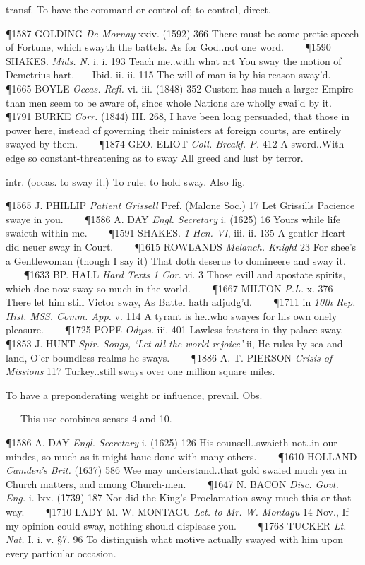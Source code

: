 \begin{description}[wide, labelwidth=!, labelindent=0pt]
\begin{myenumerate}
 transf. To have the command or control of; to control, direct.

\P 1587 GOLDING  \textit{De Mornay} xxiv. (1592) 366 There must be some pretie speech of Fortune, which swayth the battels. As for God..not one word.    
\P 1590 SHAKES.  \textit{Mids. N.} i. i. 193 Teach me..with what art You sway the motion of Demetrius hart.    Ibid. ii. ii. 115 The will of man is by his reason sway'd.    
\P 1665 BOYLE  \textit{Occas. Refl.} vi. iii. (1848) 352 Custom has much a larger Empire than men seem to be aware of, since whole Nations are wholly swai'd by it.    
\P 1791 BURKE  \textit{Corr.} (1844) III. 268, I have been long persuaded, that those in power here, instead of governing their ministers at foreign courts, are entirely swayed by them.    
\P 1874 GEO. ELIOT  \textit{Coll. Breakf. P.} 412 A sword..With edge so constant-threatening as to sway All greed and lust by terror.

 intr. (occas. to sway it.) To rule; to hold sway. Also fig.

\P 1565 J. PHILLIP  \textit{Patient Grissell} Pref. (Malone Soc.) 17 Let Grissills Pacience swaye in you.    
\P 1586 A. DAY  \textit{Engl. Secretary} i. (1625) 16 Yours while life swaieth within me.    
\P 1591 SHAKES.  \textit{1 Hen. VI}, iii. ii. 135 A gentler Heart did neuer sway in Court.    
\P 1615 ROWLANDS  \textit{Melanch. Knight} 23 For shee's a Gentlewoman (though I say it) That doth deserue to domineere and sway it.    
\P 1633 BP. HALL  \textit{Hard Texts 1 Cor.} vi. 3 Those evill and apostate spirits, which doe now sway so much in the world.    
\P 1667 MILTON  \textit{P.L.} x. 376 There let him still Victor sway, As Battel hath adjudg'd.    
\P 1711 in  \textit{10th Rep. Hist. MSS. Comm. App.} v. 114 A tyrant is he..who swayes for his own onely pleasure.    
\P 1725 POPE  \textit{Odyss.} iii. 401 Lawless feasters in thy palace sway.    
\P 1853 J. HUNT  \textit{Spir. Songs, ‘Let all the world rejoice’} ii, He rules by sea and land, O'er boundless realms he sways.    
\P 1886 A. T. PIERSON  \textit{Crisis of Missions} 117 Turkey..still sways over one million square miles.

 To have a preponderating weight or influence, prevail. Obs.

   This use combines senses 4 and 10.

\P 1586 A. DAY  \textit{Engl. Secretary} i. (1625) 126 His counsell..swaieth not..in our mindes, so much as it might haue done with many others.    
\P 1610 HOLLAND  \textit{Camden's Brit.} (1637) 586 Wee may understand..that gold swaied much yea in Church matters, and among Church-men.    
\P 1647 N. BACON  \textit{Disc. Govt. Eng.} i. lxx. (1739) 187 Nor did the King's Proclamation sway much this or that way.    
\P 1710 LADY  M. W. MONTAGU \textit{Let. to Mr. W. Montagu} 14 Nov., If my opinion could sway, nothing should displease you.    
\P 1768 TUCKER  \textit{Lt. Nat.} I. i. v. §7. 96 To distinguish what motive actually swayed with him upon every particular occasion.


\end{myenumerate}
\end{description}
